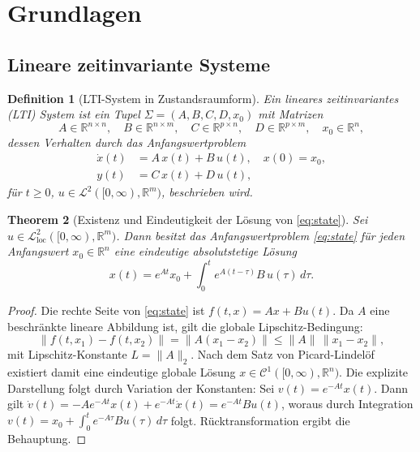 ﻿\documentclass[12pt,a4paper]{article}
\newtheorem{theorem}{Theorem}[section]
\newtheorem{definition}[theorem]{Definition}
\theoremstyle{definition}
\begin{document}
\section{Grundlagen}
\label{sec:grundlagen}

\subsection{Lineare zeitinvariante Systeme}

\begin{definition}[LTI-System in Zustandsraumform]
\label{def:lti}
Ein \emph{lineares zeitinvariantes} (LTI) System ist ein Tupel
$\Sigma = (A, B, C, D, x_0)$ mit Matrizen
\[
  A \in \mathbb{R}^{n \times n},\quad
  B \in \mathbb{R}^{n \times m},\quad
  C \in \mathbb{R}^{p \times n},\quad
  D \in \mathbb{R}^{p \times m},\quad
  x_0 \in \mathbb{R}^n,
\]
dessen Verhalten durch das Anfangswertproblem
\begin{align}
  \dot{x}(t) &= A\,x(t) + B\,u(t), \quad x(0) = x_0, \label{eq:state}\\
  y(t) &= C\,x(t) + D\,u(t), \label{eq:output}
\end{align}
für $t \geq 0$, $u \in \mathcal{L}^2([0,\infty), \mathbb{R}^m)$, beschrieben wird.
\end{definition}

\begin{theorem}[Existenz und Eindeutigkeit der Lösung von \eqref{eq:state}]
\label{thm:ex}
Sei $u \in \mathcal{L}^2_{\mathrm{loc}}([0,\infty), \mathbb{R}^m)$. Dann besitzt
das Anfangswertproblem \eqref{eq:state} für jeden Anfangswert $x_0 \in \mathbb{R}^n$
eine eindeutige absolutstetige Lösung
\[
  x(t) = e^{At} x_0 + \int_0^t e^{A(t-\tau)} B\, u(\tau)\, d\tau.
\]
\end{theorem}

\begin{proof}
Die rechte Seite von \eqref{eq:state} ist $f(t,x) = Ax + Bu(t)$. Da $A$ eine
beschränkte lineare Abbildung ist, gilt die globale Lipschitz-Bedingung:
\[
  \|f(t,x_1) - f(t,x_2)\| = \|A(x_1-x_2)\| \leq \|A\|\,\|x_1-x_2\|,
\]
mit Lipschitz-Konstante $L = \|A\|_2$. Nach dem Satz von Picard-Lindelöf
existiert damit eine eindeutige globale Lösung $x \in \mathcal{C}^1([0,\infty),
\mathbb{R}^n)$. Die explizite Darstellung folgt durch Variation der Konstanten:
Sei $v(t) = e^{-At} x(t)$. Dann gilt
$\dot{v}(t) = -A e^{-At} x(t) + e^{-At}\dot{x}(t) = e^{-At} Bu(t)$,
woraus durch Integration
$v(t) = x_0 + \int_0^t e^{-A\tau} Bu(\tau)\,d\tau$
folgt. Rücktransformation ergibt die Behauptung.
\end{proof}
\end{document}
